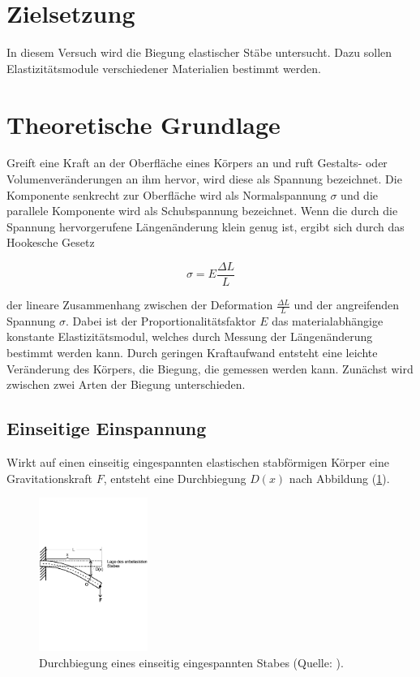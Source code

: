 \section{Zielsetzung}
In diesem Versuch wird die Biegung elastischer Stäbe untersucht.
Dazu sollen Elastizitätsmodule verschiedener Materialien bestimmt werden. 

\section{Theoretische Grundlage}
Greift eine Kraft an der Oberfläche eines Körpers an und ruft Gestalts- oder Volumenveränderungen an ihm hervor,
wird diese als Spannung bezeichnet.
Die Komponente senkrecht zur Oberfläche wird als Normalspannung $\sigma$ und die parallele Komponente wird als Schubspannung bezeichnet.
Wenn die durch die Spannung hervorgerufene Längenänderung klein genug ist, 
ergibt sich durch das Hookesche Gesetz 

\begin{equation}
\sigma = E \frac{\Delta L}{L}
\end{equation}

\noindent
der lineare Zusammenhang zwischen der Deformation $\frac{\Delta L}{L}$ und der angreifenden Spannung $\sigma$.
Dabei ist der Proportionalitätsfaktor $E$ das materialabhängige konstante  Elastizitätsmodul,
welches durch Messung der Längenänderung bestimmt werden kann.
Durch geringen Kraftaufwand entsteht eine leichte Veränderung des Körpers, die Biegung,
die gemessen werden kann.
Zunächst wird zwischen zwei Arten der Biegung unterschieden.

\subsection{Einseitige Einspannung}
    Wirkt auf einen einseitig eingespannten elastischen stabförmigen Körper eine Gravitationskraft $F$,
    entsteht eine Durchbiegung $D(x)$ nach Abbildung (\ref{fig:eins}).
    
    \begin{figure}
        \centering
           \includegraphics[height=5cm]{eins.pdf}
           \caption{Durchbiegung eines einseitig eingespannten Stabes (Quelle: \cite{V103}).}
           \label{fig:eins}
    \end{figure}
    
